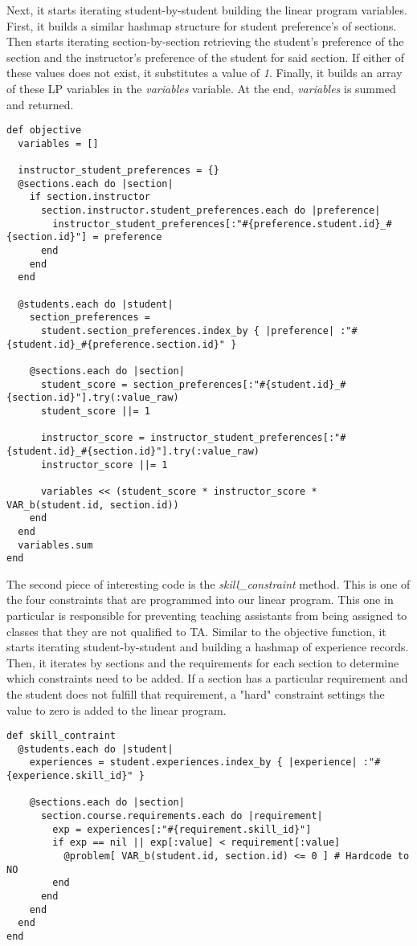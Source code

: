 Next, it starts iterating student-by-student building the linear program variables.
First, it builds a similar hashmap structure for student preference's of sections.
Then starts iterating section-by-section retrieving the student's preference of the section and the instructor's preference of the student for said section.
If either of these values does not exist, it substitutes a value of \textit{1}.
Finally, it builds an array of these LP variables in the \textit{variables} variable.
At the end, \textit{variables} is summed and returned.

\begin{lstlisting}
def objective
  variables = []

  instructor_student_preferences = {}
  @sections.each do |section|
    if section.instructor
      section.instructor.student_preferences.each do |preference|
        instructor_student_preferences[:"#{preference.student.id}_#{section.id}"] = preference
      end
    end
  end

  @students.each do |student|
    section_preferences =
      student.section_preferences.index_by { |preference| :"#{student.id}_#{preference.section.id}" }

    @sections.each do |section|
      student_score = section_preferences[:"#{student.id}_#{section.id}"].try(:value_raw)
      student_score ||= 1

      instructor_score = instructor_student_preferences[:"#{student.id}_#{section.id}"].try(:value_raw)
      instructor_score ||= 1

      variables << (student_score * instructor_score * VAR_b(student.id, section.id))
    end
  end
  variables.sum
end
\end{lstlisting}

The second piece of interesting code is the \textit{skill\_constraint} method.
This is one of the four constraints that are programmed into our linear program.
This one in particular is responsible for preventing teaching assistants from being assigned to classes that they are not qualified to TA.
Similar to the objective function, it starts iterating student-by-student and building a hashmap of experience records.
Then, it iterates by sections and the requirements for each section to determine which constraints need to be added.
If a section has a particular requirement and the student does not fulfill that requirement, a "hard" constraint settings the value to zero is added to the linear program.

\begin{lstlisting}
def skill_contraint
  @students.each do |student|
    experiences = student.experiences.index_by { |experience| :"#{experience.skill_id}" }

    @sections.each do |section|
      section.course.requirements.each do |requirement|
        exp = experiences[:"#{requirement.skill_id}"]
        if exp == nil || exp[:value] < requirement[:value]
          @problem[ VAR_b(student.id, section.id) <= 0 ] # Hardcode to NO
        end
      end
    end
  end
end
\end{lstlisting}
